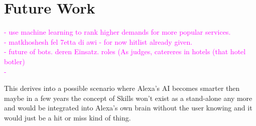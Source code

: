 \section{Future Work}
\textcolor{magenta}{
- use machine learning to rank higher demands for more popular services.\\ 
- matkhoshesh fel 7etta di awi - for now hitlist already given.\\
- future of bots. deren Einsatz. roles (As judges, catereres in hotels (that hotel botler) \\
-\\
}






This derives into a possible scenario where Alexa's AI becomes smarter then maybe in a few years the concept of Skills won't exist as a stand-alone any more and would be integrated into Alexa's own brain without the user knowing and it would just be a hit or miss kind of thing.